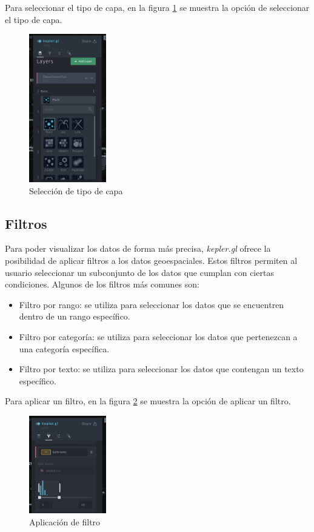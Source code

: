 Para seleccionar el tipo de capa, en la figura \ref{fig:avanzado-tipo} se muestra
la opción de seleccionar el tipo de capa.

\begin{figure}[H]
    \centering
    \includegraphics[width=0.3\textwidth]{imagenes/05-mapa-interactivo/avanzado-tipo.png}
    \caption{Selección de tipo de capa}
    \label{fig:avanzado-tipo}
\end{figure}

\subsection{Filtros}
Para poder visualizar los datos de forma más precisa, \textit{kepler.gl} ofrece
la posibilidad de aplicar filtros a los datos geoespaciales. Estos filtros
permiten al usuario seleccionar un subconjunto de los datos que cumplan con
ciertas condiciones. Algunos de los filtros más comunes son:

\begin{itemize}
    \item Filtro por rango: se utiliza para seleccionar los datos que se encuentren
    dentro de un rango específico.
    \item Filtro por categoría: se utiliza para seleccionar los datos que pertenezcan
    a una categoría específica.
    \item Filtro por texto: se utiliza para seleccionar los datos que contengan un
    texto específico.
\end{itemize}

Para aplicar un filtro, en la figura \ref{fig:avanzado-filtro} se muestra la opción
de aplicar un filtro.

\begin{figure}[H]
    \centering
    \includegraphics[width=0.3\textwidth]{imagenes/05-mapa-interactivo/avanzado-filtro.png}
    \caption{Aplicación de filtro}
    \label{fig:avanzado-filtro}
\end{figure}


